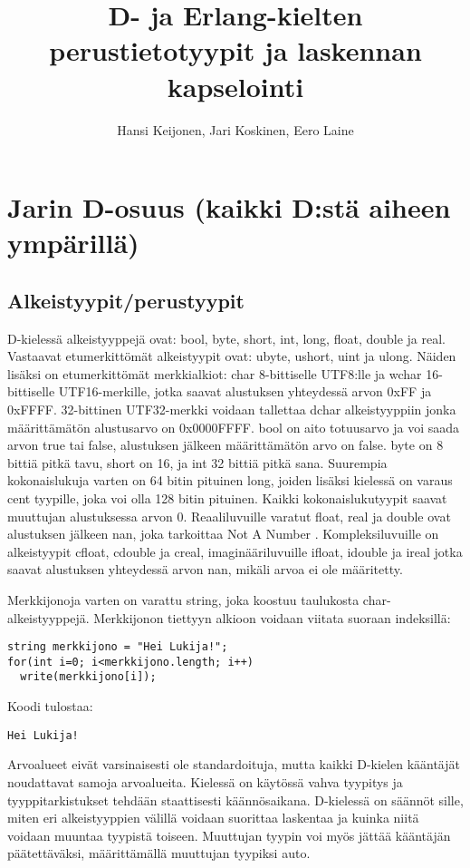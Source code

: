 \documentclass[11pt,oneside,a4paper]{article}
\title{D- ja Erlang-kielten perustietotyypit ja laskennan kapselointi}
\author{Hansi Keijonen, Jari Koskinen, Eero Laine}
\begin{document}
\maketitle

\newpage

\section{Jarin D-osuus (kaikki D:stä aiheen ympärillä)}
\subsection{Alkeistyypit/perustyypit}
D-kielessä alkeistyyppejä \cite{ALE10} ovat: bool, byte, short, int, long,
float, double ja real. Vastaavat etumerkittömät alkeistyypit ovat: ubyte,
ushort, uint ja ulong. Näiden lisäksi on etumerkittömät merkkialkiot: char
8-bittiselle UTF8:lle ja wchar 16-bittiselle UTF16-merkille, jotka saavat
alustuksen yhteydessä arvon 0xFF ja 0xFFFF. 32-bittinen UTF32-merkki voidaan
tallettaa dchar alkeistyyppiin jonka määrittämätön alustusarvo on 0x0000FFFF.
bool on aito totuusarvo ja voi saada arvon true tai false, alustuksen jälkeen
määrittämätön arvo on false. byte on 8 bittiä pitkä tavu, short on 16, ja int 32
bittiä pitkä sana. Suurempia kokonaislukuja varten on 64 bitin pituinen long,
joiden lisäksi kielessä on varaus cent tyypille, joka voi olla 128 bitin
pituinen. Kaikki kokonaislukutyypit saavat muuttujan alustuksessa arvon 0.
Reaaliluvuille varatut float, real ja double ovat alustuksen jälkeen nan, joka
tarkoittaa Not A Number \cite{DLA13}. Kompleksiluvuille on alkeistyypit cfloat,
cdouble ja creal, 
imaginääriluvuille ifloat, idouble ja ireal jotka saavat alustuksen yhteydessä
arvon nan, mikäli arvoa ei ole määritetty.

Merkkijonoja varten on varattu string, joka koostuu taulukosta
char-alkeistyyppejä. Merkkijonon tiettyyn alkioon voidaan viitata suoraan
indeksillä:

\begin{verbatim}
string merkkijono = "Hei Lukija!";
for(int i=0; i<merkkijono.length; i++)
  write(merkkijono[i]);
\end{verbatim}
Koodi tulostaa:
\begin{verbatim}
Hei Lukija!
\end{verbatim}

Arvoalueet eivät varsinaisesti ole standardoituja, mutta kaikki D-kielen
kääntäjät noudattavat samoja arvoalueita. Kielessä on käytössä vahva tyypitys ja
tyyppitarkistukset tehdään staattisesti käännösaikana. D-kielessä on säännöt
sille, miten eri alkeistyyppien välillä voidaan suorittaa laskentaa ja kuinka
niitä voidaan muuntaa tyypistä toiseen. Muuttujan tyypin voi myös jättää
kääntäjän päätettäväksi, määrittämällä muuttujan tyypiksi auto.
\end{document}
